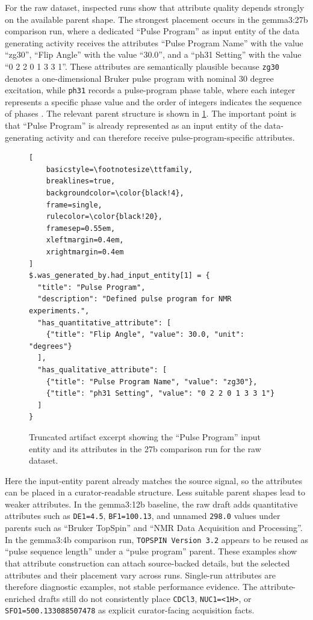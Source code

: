 For the raw dataset, inspected runs show that attribute quality depends strongly on the available parent shape.
The strongest placement occurs in the gemma3:27b comparison run, where a dedicated \enquote{Pulse Program} as input entity of the data generating activity receives the attributes \enquote{Pulse Program Name} with the value \enquote{zg30}, \enquote{Flip Angle} with the value \enquote{30.0}, and a \enquote{ph31 Setting} with the value \enquote{0 2 2 0 1 3 3 1}.
These attributes are semantically plausible because \texttt{zg30} denotes a one-dimensional Bruker pulse program with nominal 30 degree excitation, while \texttt{ph31} records a pulse-program phase table, where each integer represents a specific phase value and the order of integers indicates the sequence of phases \cite{kim2019optimization}.
The relevant parent structure is shown in \cref{fig:evaluation-pulse-program-parent-shape}.
The important point is that \enquote{Pulse Program} is already represented as an input entity of the data-generating activity and can therefore receive pulse-program-specific attributes.

\begin{figure}[htbp]
\begin{lstlisting}[
    basicstyle=\footnotesize\ttfamily,
    breaklines=true,
    backgroundcolor=\color{black!4},
    frame=single,
    rulecolor=\color{black!20},
    framesep=0.55em,
    xleftmargin=0.4em,
    xrightmargin=0.4em
]
$.was_generated_by.had_input_entity[1] = {
  "title": "Pulse Program",
  "description": "Defined pulse program for NMR experiments.",
  "has_quantitative_attribute": [
    {"title": "Flip Angle", "value": 30.0, "unit": "degrees"}
  ],
  "has_qualitative_attribute": [
    {"title": "Pulse Program Name", "value": "zg30"},
    {"title": "ph31 Setting", "value": "0 2 2 0 1 3 3 1"}
  ]
}
\end{lstlisting}
    \caption{Truncated artifact excerpt showing the \enquote{Pulse Program} input entity and its attributes in the 27b comparison run for the raw dataset.}
    \label{fig:evaluation-pulse-program-parent-shape}
\end{figure}

Here the input-entity parent already matches the source signal, so the attributes can be placed in a curator-readable structure.
Less suitable parent shapes lead to weaker attributes.
In the gemma3:12b baseline, the raw draft adds quantitative attributes such as \texttt{DE1=4.5}, \texttt{BF1=100.13}, and unnamed \texttt{298.0} values under parents such as \enquote{Bruker TopSpin} and \enquote{NMR Data Acquisition and Processing}.
In the gemma3:4b comparison run, \texttt{TOPSPIN Version 3.2} appears to be reused as \enquote{pulse sequence length} under a \enquote{pulse program} parent.
These examples show that attribute construction can attach source-backed details, but the selected attributes and their placement vary across runs.
Single-run attributes are therefore diagnostic examples, not stable performance evidence.
The attribute-enriched drafts still do not consistently place \texttt{CDCl3}, \texttt{NUC1=<1H>}, or \texttt{SFO1=500.133088507478} as explicit curator-facing acquisition facts.

